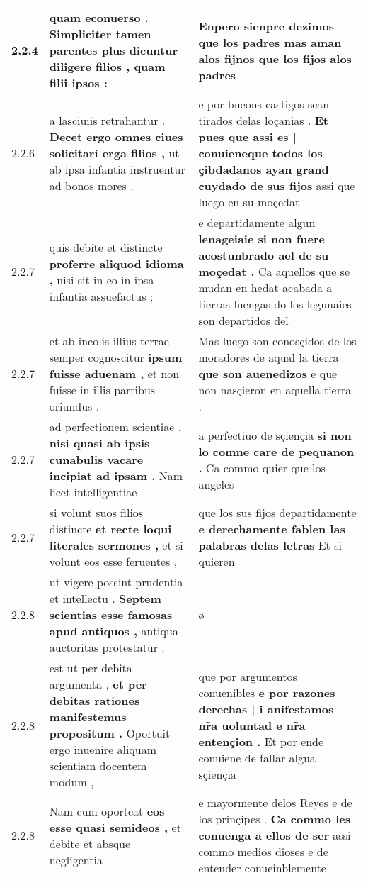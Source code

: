 \begin{tabular}{|p{1cm}|p{6.5cm}|p{6.5cm}|}
2.2.4 & quam econuerso . \textbf{ Simpliciter tamen parentes plus dicuntur diligere filios , } quam filii ipsos : & Enpero sienpre dezimos \textbf{ que los padres mas aman alos fijnos } que los fijos alos padres \\\hline
2.2.6 & a lasciuiis retrahantur . \textbf{ Decet ergo omnes ciues solicitari erga filios , } ut ab ipsa infantia instruentur ad bonos mores . & e por bueons castigos sean tirados delas loçanias . \textbf{ Et pues que assi es | conuieneque todos los çibdadanos ayan grand cuydado de sus fijos } assi que luego en su moçedat \\\hline
2.2.7 & quis debite et distincte \textbf{ proferre aliquod idioma , } nisi sit in eo in ipsa infantia assuefactus ; & e departidamente algun \textbf{ lenageiaie si non fuere acostunbrado ael de su moçedat . } Ca aquellos que se mudan en hedat acabada a tierras luengas do los legunaies son departidos del \\\hline
2.2.7 & et ab incolis illius terrae semper cognoscitur \textbf{ ipsum fuisse aduenam , } et non fuisse in illis partibus oriundus . & Mas luego son conosçidos de los moradores de aqual la tierra \textbf{ que son auenedizos } e que non nasçieron en aquella tierra . \\\hline
2.2.7 & ad perfectionem scientiae , \textbf{ nisi quasi ab ipsis cunabulis vacare incipiat ad ipsam . } Nam licet intelligentiae & a perfectiuo de sçiençia \textbf{ si non lo comne care de pequanon . } Ca commo quier que los angeles \\\hline
2.2.7 & si volunt suos filios distincte \textbf{ et recte loqui literales sermones , } et si volunt eos esse feruentes , & que los sus fijos departidamente \textbf{ e derechamente fablen las palabras delas letras } Et si quieren \\\hline
2.2.8 & ut vigere possint prudentia et intellectu . \textbf{ Septem scientias esse famosas apud antiquos , } antiqua auctoritas protestatur . & ø \\\hline
2.2.8 & est ut per debita argumenta , \textbf{ et per debitas rationes manifestemus propositum . } Oportuit ergo inuenire aliquam scientiam docentem modum , & que por argumentos conuenibles \textbf{ e por razones derechas | i anifestamos nr̃a uoluntad e nr̃a entençion . } Et por ende conuiene de fallar algua sçiençia \\\hline
2.2.8 & Nam cum oporteat \textbf{ eos esse quasi semideos , } et debite et absque negligentia & e mayormente delos Reyes e de los prinçipes . \textbf{ Ca commo les conuenga a ellos de ser } assi commo medios dioses e de entender conueinblemente \\\hline

\end{tabular}

